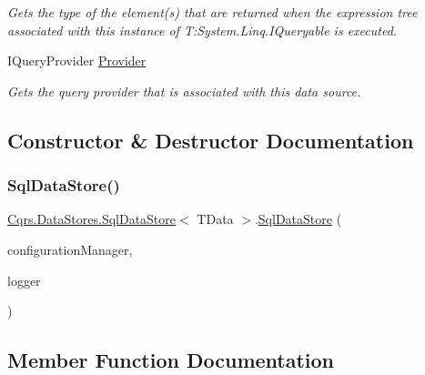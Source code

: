 \begin{DoxyCompactItemize}
\begin{DoxyCompactList}\small\item\em Gets the type of the element(s) that are returned when the expression tree associated with this instance of T\+:\+System.\+Linq.\+I\+Queryable is executed. \end{DoxyCompactList}\item 
I\+Query\+Provider \hyperlink{classCqrs_1_1DataStores_1_1SqlDataStore_aec0093c6fe2adc41899c2418a0e324d9}{Provider}
\begin{DoxyCompactList}\small\item\em Gets the query provider that is associated with this data source. \end{DoxyCompactList}\end{DoxyCompactItemize}


\subsection{Constructor \& Destructor Documentation}
\mbox{\label{classCqrs_1_1DataStores_1_1SqlDataStore_a0ce9b3f74799e463d4f53eda386d5577}} 
\subsubsection{\texorpdfstring{Sql\+Data\+Store()}{SqlDataStore()}}
{\footnotesize\ttfamily \hyperlink{classCqrs_1_1DataStores_1_1SqlDataStore}{Cqrs.\+Data\+Stores.\+Sql\+Data\+Store}$<$ T\+Data $>$.\hyperlink{classCqrs_1_1DataStores_1_1SqlDataStore}{Sql\+Data\+Store} (\begin{DoxyParamCaption}\item[{\hyperlink{interfaceCqrs_1_1Configuration_1_1IConfigurationManager}{I\+Configuration\+Manager}}]{configuration\+Manager,  }\item[{I\+Logger}]{logger }\end{DoxyParamCaption})}



\subsection{Member Function Documentation}
\mbox{\label{classCqrs_1_1DataStores_1_1SqlDataStore_abcca53d2e93dbdfb193a9fb0996849c5}} 
